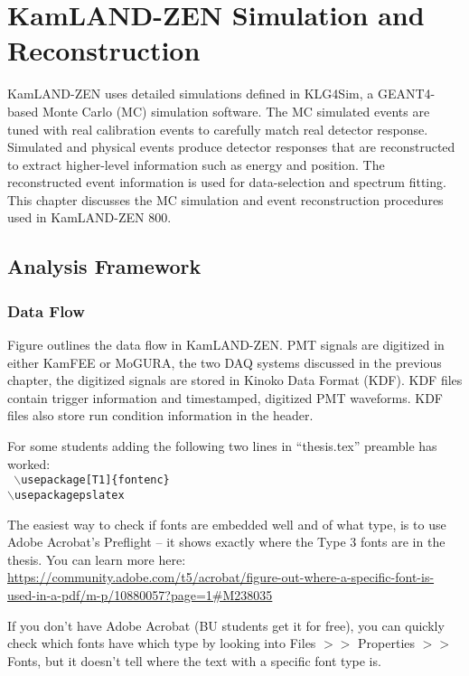 \chapter{KamLAND-ZEN Simulation and Reconstruction}
\label{chapter:details}
\thispagestyle{myheadings}

\graphicspath{{3_Chapter_Details/Figures/}}

KamLAND-ZEN uses detailed simulations defined in KLG4Sim, a GEANT4-based Monte Carlo (MC) simulation software. The MC simulated events are tuned with real calibration events to carefully match real detector response. Simulated and physical events produce detector responses that are reconstructed to extract higher-level information such as energy and position. The reconstructed event information is used for data-selection and spectrum fitting. This chapter discusses the MC simulation and event reconstruction procedures used in KamLAND-ZEN 800.

\section*{Analysis Framework}
\subsection*{Data Flow}
Figure outlines the data flow in KamLAND-ZEN. PMT signals are digitized in either KamFEE or MoGURA, the two DAQ systems discussed in the previous chapter, the digitized signals are stored in Kinoko Data Format (KDF). KDF files contain trigger information and timestamped, digitized PMT waveforms. KDF files also store run condition information in the header.

For some students adding the following two lines in ``thesis.tex'' preamble has worked:\\
%
{\tt
$\backslash$usepackage[T1]\{fontenc\}\\
$\backslash$usepackage{pslatex}
   } 


The easiest way to check if fonts are embedded well and of what type, is to use Adobe Acrobat's Preflight -- it shows exactly where the Type 3 fonts are in the thesis. You can learn more here: \url{https://community.adobe.com/t5/acrobat/figure-out-where-a-specific-font-is-used-in-a-pdf/m-p/10880057?page=1#M238035}

If you don't have Adobe Acrobat (BU students get it for free), you can quickly check which fonts have which type by looking into Files $>>$ Properties $>>$ Fonts, but it doesn't tell where the text with a specific font type is.

